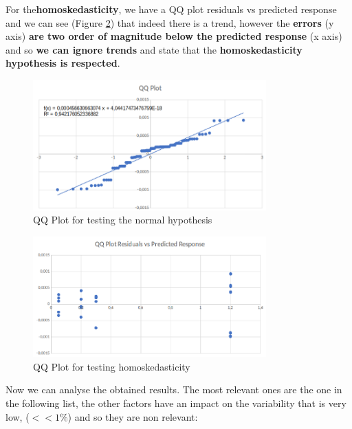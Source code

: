 \noindent For the\textbf{homoskedasticity}, we have a QQ plot residuals vs predicted response and we can see (Figure \ref{img: homoskedasticity_throughput}) that indeed there is a trend, however the \textbf{errors} (y axis) \textbf{are two order of magnitude below the predicted response} (x axis) and so \textbf{we can ignore trends} and state that the \textbf{homoskedasticity hypothesis is respected}.

\begin{figure}[H]
	\centering
	\includegraphics[width=0.8\textwidth]{img/QQplot_2kr_throughput.png}
	\caption{QQ Plot for testing the normal hypothesis}
	\label {img: qqplot_throughput}
\end{figure}

\begin{figure}[H]
	\centering
	\includegraphics[width=0.8\textwidth]{img/homoskedasticity_2kr_throughput.png}
	\caption{QQ Plot for testing homoskedasticity}
	\label {img: homoskedasticity_throughput}
\end{figure}

\noindent Now we can analyse the obtained results. The most relevant ones are the one in the following list, the other factors have an impact on the variability that is very low, ($<<1\%$) and so they are non relevant:

